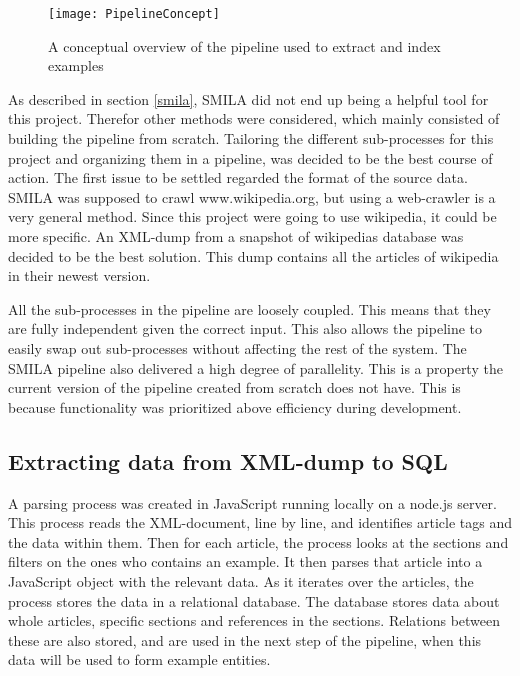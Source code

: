 
\begin{figure}[h]
\caption{A conceptual overview of the pipeline used to extract and index examples}
\texttt{[image: PipelineConcept]}
\end{figure}



As described in section \ref{smila}, SMILA did not end up being a helpful tool for this project. Therefor other methods were considered, which mainly consisted of building the pipeline from scratch. Tailoring the different sub-processes for this project and organizing them in a pipeline, was decided to be the best course of action. The first issue to be settled regarded the format of the source data. SMILA was supposed to crawl www.wikipedia.org, but using a web-crawler is a very general method. Since this project were going to use wikipedia, it could be more specific. An XML-dump from a snapshot of wikipedias database was decided to be the best solution. This dump contains all the articles of wikipedia in their newest version.


All the sub-processes in the pipeline are loosely coupled. This means that they are fully independent given the correct input. This also allows the pipeline to easily swap out sub-processes without affecting the rest of the system. The SMILA pipeline also delivered a high degree of parallelity. This is a property the current version of the pipeline created from scratch does not have. This is because functionality was prioritized above efficiency during development. 

\subsection{Extracting data from XML-dump to SQL}

A parsing process was created in JavaScript running locally on a node.js server. This process reads the XML-document, line by line, and identifies article tags and the data within them. Then for each article, the process looks at the sections and filters on the ones who contains an example. It then parses that article into a JavaScript object with the relevant data. As it iterates over the articles, the process stores the data in a relational database. The database stores data about whole articles, specific sections and references in the sections. Relations between these are also stored, and are used in the next step of the pipeline, when this data will be used to form example entities. 


